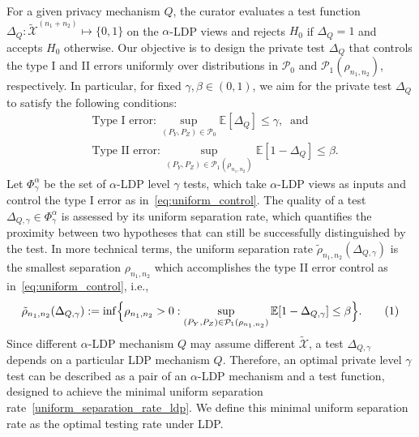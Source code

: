 \documentclass[twoside,11pt]{article}
\newcommand\numberthis{\addtocounter{equation}{1}\tag{\theequation}}
\newcommand{\test}{\Delta}
\newcommand{\distClassGeneric}{\mathcal{P}}
\newcommand{\minSep}{\rho} %
\newcommand{\rvX}{X} %
\newcommand{\rvXCodomain}{\mathcal{\rvX}} %
\newcommand{\rvXPrivCodomain}{\tilde{\rvXCodomain}}
\newcommand{\sampleSize}{n}
\newcommand{\privacyMechanism}{Q}
\newcommand{\privacyParameter}{\alpha} %
\newcommand{\maxErrorTypeTwo}{\beta} %
\newcommand{\maxErrorTypeOne}{\gamma} %
\begin{document}
For a given privacy mechanism $Q$, the curator evaluates a test function
$\test_Q: \rvXPrivCodomain^{(\sampleSize_1 + \sampleSize_2)}
\mapsto
\{0,1\}$ on the $\privacyParameter$-LDP views
and rejects $H_0$ if $\test_\privacyMechanism = 1$ and accepts $H_0$ otherwise. Our objective is to design the private test $\test_Q$ that controls the type I and II errors uniformly over distributions in $\distClassGeneric_0$ and $\distClassGeneric_1(\minSep_{\sampleSize_1, \sampleSize_2})$, respectively. In particular, for fixed $\maxErrorTypeOne, \maxErrorTypeTwo \in (0,1)$, we aim for the private test $\test_Q$ to satisfy the following conditions: 
\begin{equation}
	\begin{aligned} \label{eq:uniform_control}
		& \text{Type I error:} \, \sup_{(P_Y,P_Z) \in \distClassGeneric_0}
		\mathbb{E}
		[ \Delta_Q ] \leq \gamma,
		\;\; \text{and} \\%
		& \text{Type II error:} \, \sup_{
			(P_Y,P_Z)
			\in
			\mathcal{P}_1(\rho_{n_1, n_2})
		}
		\mathbb{E}
		[1-\Delta_Q] \leq \beta.
	\end{aligned}
\end{equation}
Let $\Phi^{\privacyParameter}_{\maxErrorTypeOne}$ be the set of $\privacyParameter$-LDP level $\maxErrorTypeOne$ tests, which take $\privacyParameter$-LDP views as inputs
and control the type I error as in~\eqref{eq:uniform_control}.
The quality of a test $\test_{Q, \gamma} \in \Phi^{\privacyParameter}_\maxErrorTypeOne$ is assessed by its uniform separation rate, which quantifies the proximity between two hypotheses that can still be successfully distinguished by the test.
In more technical terms, the uniform separation rate
$\tilde{\minSep}_{\sampleSize_1, \sampleSize_2}( \test_{Q, \gamma} )$ is the smallest separation $\minSep_{\sampleSize_1, \sampleSize_2}$ which accomplishes the type II error control as in~\eqref{eq:uniform_control}, i.e.,
%
\begin{align*}
	\tilde{\rho}_{\sampleSize_1, \sampleSize_2}
	( \Delta_{Q, \gamma} )
	:=
	\inf
	\Bigl\{
	\minSep_{\sampleSize_1, \sampleSize_2} > 0
	:
	\sup_{(P_Y,P_Z) \in \distClassGeneric_1(\minSep_{\sampleSize_1, \sampleSize_2})}
	\mathbb{E}
	[
	1-\Delta_{Q, \gamma}
	]\leq \beta
	\Bigr\}.
	\numberthis \label{uniform_separation_rate_ldp}
\end{align*}
%
Since different $\privacyParameter$-LDP mechanism $\privacyMechanism$ may assume different $\rvXPrivCodomain$, a test $\test_{Q, \gamma}$ depends on a particular LDP mechanism $\privacyMechanism$.
Therefore, an optimal private level $\maxErrorTypeOne$ test can be described as a pair of an $\privacyParameter$-LDP mechanism and a test function, designed to achieve the minimal uniform separation rate~\eqref{uniform_separation_rate_ldp}. We define this minimal uniform separation rate as the optimal testing rate under LDP.
\end{document}
